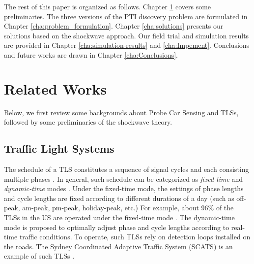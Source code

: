 \documentclass[final,oneside,onecolumn,12pt,a4paper]{book}%
\begin{document}
The rest of this paper is organized as follows. Chapter
\ref{cha:related-works} covers some preliminaries.
The three versions of the PTI discovery problem are formulated in Chapter
\ref{cha:problem_formulation}. Chapter \ref{cha:solutions} presents our
solutions based on the shockwave approach. Our field trial and simulation
results are provided in Chapter \ref{cha:simulation-results} and
\ref{cha:Impement}. Conclusions and future works are drawn in Chapter
\ref{cha:Conclusions}.

\chapter{Related Works}

\label{cha:related-works}

Below, we first review some backgrounds about Probe Car Sensing and TLSs,
followed by some preliminaries of the shockwave theory.

\section{Traffic Light Systems}

The schedule of a TLS constitutes a sequence of signal cycles and each
consisting multiple phases \cite{Banks2002Transportation}. In general, such
schedule can be categorized as \emph{fixed-time} and \emph{dynamic-time} modes
\cite{Banks2002Transportation}. Under the fixed-time mode, the settings of
phase lengths and cycle lengths are fixed according to different durations of
a day (such as off-peak, am-peak, pm-peak, holiday-peak, etc.) For example,
about 96\% of the TLSs in the US are operated under the fixed-time mode
\cite{Koukoumidis2011SignalGuru}. The dynamic-time mode is proposed to
optimally adjust phase and cycle lengths according to real-time traffic
conditions. To operate, such TLSs rely on detection loops installed on the
roads. The Sydney Coordinated Adaptive Traffic System (SCATS) is an example of
such TLSs \cite{Akcelik2001SCARTS}.
\end{document}
